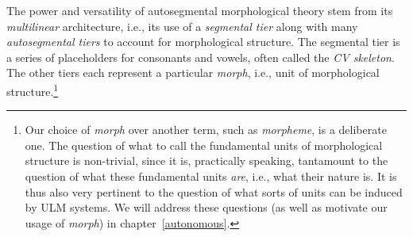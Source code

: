 The power and versatility of autosegmental morphological theory \citep{mccarthy:1981}
stem from its \emph{multilinear} architecture, i.e., its
use of a \emph{segmental tier} along with many \emph{autosegmental tiers} 
to account for morphological structure. The segmental tier is
a series of placeholders for consonants and vowels, often called the
\emph{CV skeleton}. The other tiers each represent a particular \emph{morph}, i.e., unit of morphological structure.\footnote{Our choice of \emph{morph} over another term, such as \emph{morpheme}, is a deliberate  one. The question of what to call the fundamental units of morphological structure is non-trivial, since it is, practically speaking, tantamount to the question of what these fundamental units \emph{are}, i.e., what their nature is. It is thus also very pertinent to the question of what sorts of units can be induced by ULM systems. We will address these questions (as well as motivate our usage of \emph{morph}) in chapter~\ref{autonomous}.}
 

